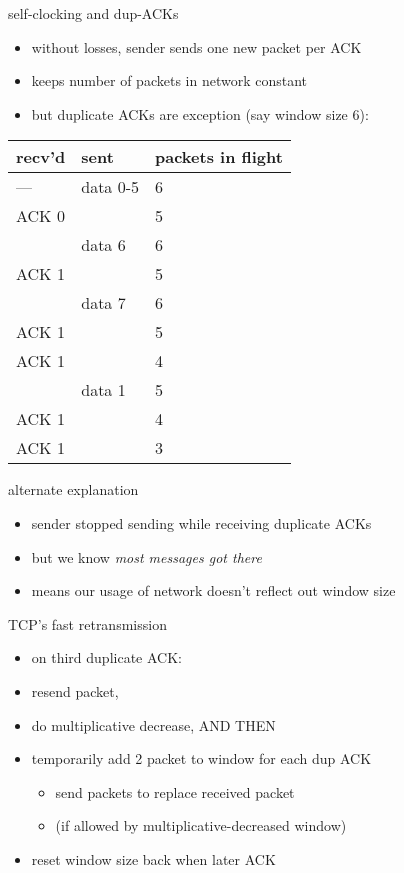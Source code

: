 \begin{frame}{self-clocking and dup-ACKs}
    \begin{itemize}
    \item without losses, sender sends one new packet per ACK
    \item keeps number of packets in network constant
    \item but duplicate ACKs are exception (say window size 6):
    \end{itemize}
{\fontsize{10}{11}\selectfont
\begin{tabular}{lll}
recv'd & sent & packets in flight \\ \hline
--- & data 0-5 & 6 \\
ACK 0 & ~ & 5 \\
~ & data 6 & 6 \\
ACK 1 & ~ & 5 \\
~ & data 7 & 6 \\
ACK 1 & ~  & 5 \\
ACK 1 & ~  & 4 \\
~ & data 1 & 5 \\
ACK 1 & ~ & 4 \\
ACK 1 & ~ & 3 \\
\end{tabular}
}
\end{frame}

\begin{frame}{alternate explanation}
    \begin{itemize}
    \item sender stopped sending while receiving duplicate ACKs
    \item but we know \textit{most messages got there}
    \item means our usage of network doesn't reflect out window size
    \end{itemize}
\end{frame}

\begin{frame}{TCP's fast retransmission}
\begin{itemize}
\item on third duplicate ACK:
\vspace{.5cm}
\item resend packet,
\item do multiplicative decrease, AND THEN
\item temporarily add 2 packet to window for each dup ACK
    \begin{itemize}
    \item send packets to replace received packet
    \item (if allowed by multiplicative-decreased window)
    \end{itemize}
\item reset window size back when later ACK
\end{itemize}
\end{frame}

